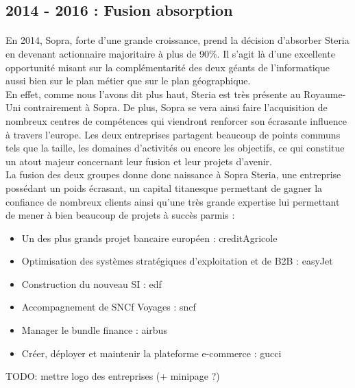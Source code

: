 \subsection{2014 - 2016 : Fusion absorption}

\paragraph{}

En 2014, Sopra, forte d'une grande croissance, prend la décision d'absorber Steria en devenant actionnaire majoritaire à plus de 90\%. Il s'agit là d'une excellente opportunité misant sur la complémentarité des deux géants de l'informatique aussi bien sur le plan métier que sur le plan géographique. \\

En effet, comme nous l'avons dit plus haut, Steria est très présente au Royaume-Uni contrairement à Sopra. De plus, Sopra se vera ainsi faire l'acquisition de nombreux centres de compétences qui viendront renforcer son écrasante influence à travers l'europe. Les deux entreprises partagent beaucoup de points communs tels que la taille, les domaines d'activités ou encore les objectifs, ce qui constitue un atout majeur concernant leur fusion et leur projets d'avenir. \\

La fusion des deux groupes donne donc naissance à Sopra Steria, une entreprise possédant un poids écrasant, un capital titanesque permettant de gagner la confiance de nombreux clients ainsi qu'une très grande expertise lui permettant de mener à bien beaucoup de projets à succès parmis : \\
\begin{itemize}
	\item Un des plus grands projet bancaire européen : creditAgricole
	\item Optimisation des systèmes stratégiques d'exploitation et de B2B : easyJet
	\item Construction du nouveau SI : edf
	\item Accompagnement de SNCf Voyages : sncf
	\item Manager le bundle finance : airbus
	\item Créer, déployer et maintenir la plateforme e-commerce : gucci \\
\end{itemize} 
TODO: mettre logo des entreprises (+ minipage ?)